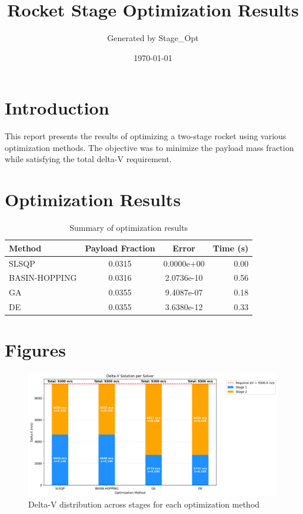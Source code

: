 \documentclass{article}
\title{Rocket Stage Optimization Results}
\author{Generated by Stage\_Opt}
\date{\today}
\begin{document}
\maketitle

\section{Introduction}
This report presents the results of optimizing a two-stage rocket using various optimization methods. The objective was to minimize the payload mass fraction while satisfying the total delta-V requirement.

\section{Optimization Results}
\begin{table}[H]
\centering
\begin{tabular}{lccr}
\toprule
Method & Payload Fraction & Error & Time (s) \\
\midrule
SLSQP & 0.0315 & 0.0000e+00 & 0.00 \\
BASIN-HOPPING & 0.0316 & 2.0736e-10 & 0.56 \\
GA & 0.0355 & 9.4087e-07 & 0.18 \\
DE & 0.0355 & 3.6380e-12 & 0.33 \\
\bottomrule
\end{tabular}
\caption{Summary of optimization results}
\label{tab:results}
\end{table}

\section{Figures}
\begin{figure}[H]
\centering
\includegraphics[width=\textwidth]{dv_breakdown.png}
\caption{Delta-V distribution across stages for each optimization method}
\label{fig:dv-breakdown}
\end{figure}
\end{document}
